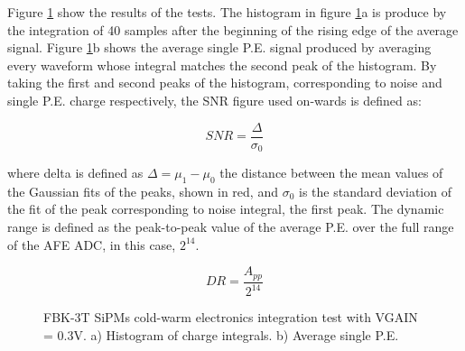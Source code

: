 Figure \ref{fig:fbk_hist_avg_vgain_03} show the results of the tests. The histogram in figure \ref{fig:fbk_hist_avg_vgain_03}a is produce by the integration of 40 samples after the beginning of the rising edge of the average signal. Figure \ref{fig:fbk_hist_avg_vgain_03}b shows the average single P.E. signal produced by averaging every waveform whose integral matches the second peak of the histogram. By taking the first and second peaks of the histogram, corresponding to noise and single P.E. charge respectively, the SNR figure used on-wards is defined as:

\begin{equation}
    SNR = \frac{\Delta}{\sigma_0}
\label{eq:SNR}
\end{equation}

where delta is defined as $\Delta = \mu_1 - \mu_0$ the distance between the mean values of the Gaussian fits of the peaks, shown in red, and $\sigma_0$ is the standard deviation of the fit of the peak corresponding to noise integral, the first peak. The dynamic range is defined as the peak-to-peak value of the average P.E. over the full range of the AFE ADC, in this case, $2^{14}$. 

\begin{equation}
    DR = \frac{A_{pp}}{2^{14}}
\label{eq:DR}
\end{equation}

\begin{figure}[h]
\centering
{}
\caption[]{FBK-3T SiPMs cold-warm electronics integration test with VGAIN = 0.3V.  a) Histogram of charge integrals. b) Average single P.E.}
\label{fig:fbk_hist_avg_vgain_03}
\end{figure}

